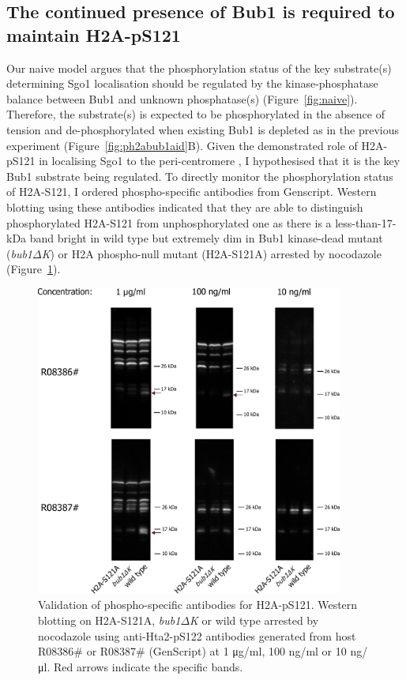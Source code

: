 \subsection{The continued presence of Bub1 is required to maintain H2A-pS121}
Our naive model argues that the phosphorylation status of the key substrate(s) determining Sgo1 localisation should be regulated by the kinase-phosphatase balance between Bub1 and unknown phosphatase(s) (Figure~\ref{fig:naive}). Therefore, the substrate(s) is expected to be phosphorylated in the absence of tension and de-phosphorylated when existing Bub1 is depleted as in the previous experiment (Figure~\ref{fig:ph2abub1aid}B). Given the demonstrated role of H2A-pS121 in localising Sgo1 to the peri-centromere \citep{Kawashima2010a, Fernius2007Bub1Mitosis, Nerusheva2014}, I hypothesised that it is the key Bub1 substrate being regulated. To directly monitor the phosphorylation status of H2A-S121, I ordered phospho-specific antibodies from Genscript. Western blotting using these antibodies indicated that they are able to distinguish phosphorylated H2A-S121 from unphosphorylated one as there is a less-than-17-\si{\kilo\dalton} band bright in wild type but extremely dim in Bub1 kinase-dead mutant (\textit{bub1$\Delta$K}) or H2A phospho-null mutant (H2A-S121A) arrested by nocodazole (Figure~\ref{fig:abtest}). 

\begin{figure}[htbp]
  \centering
  \includegraphics[width=0.9\textwidth]{chapter3/figures/pH2A ab test.pdf}
  \caption[Validation of phospho-specific antibodies for H2A-pS121]{Validation of phospho-specific antibodies for H2A-pS121. Western blotting on H2A-S121A, \textit{bub1$\Delta$K} or wild type arrested by nocodazole using anti-Hta2-pS122 antibodies generated from host R08386\# or R08387\# (GenScript) at 1 \si{\micro\gram/\milli\litre}, 100 \si{\nano\gram/\milli\litre} or 10 \si{\nano\gram/\micro\litre}. Red arrows indicate the specific bands. }
  \label{fig:abtest}
\end{figure} 

